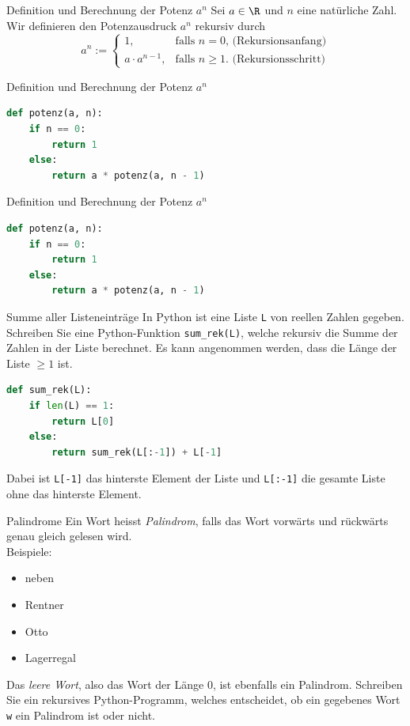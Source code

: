 \begin{frame}[fragile]{Definition und Berechnung der Potenz $a^n$}
Sei $a\in\R$ und $n$ eine natürliche Zahl. Wir definieren den Potenzausdruck $a^n$ rekursiv durch
\[
  a^n := 
  \begin{cases}
    1, &\text{falls $n=0$, (Rekursionsanfang)} \\
    a\cdot a^{n-1}, & \text{falls  $n\geq 1$. (Rekursionsschritt)}
  \end{cases}
\]
\end{frame}

\begin{frame}[fragile]{Definition und Berechnung der Potenz $a^n$}
\begin{lstlisting}[language=Python]
def potenz(a, n):
    if n == 0:
        return 1
    else:
        return a * potenz(a, n - 1)
\end{lstlisting}
\end{frame}

\begin{frame}[fragile]{Definition und Berechnung der Potenz $a^n$}
\begin{lstlisting}[language=Python]
def potenz(a, n):
    if n == 0:
        return 1
    else:
        return a * potenz(a, n - 1)
\end{lstlisting}
\end{frame}


\begin{frame}[fragile]{Summe aller Listeneinträge}
In Python ist eine Liste \lstinline|L| von reellen Zahlen gegeben. Schreiben Sie eine Python-Funktion \lstinline|sum_rek(L)|, welche rekursiv die Summe der Zahlen in der Liste berechnet. Es kann angenommen werden, dass die Länge der Liste $\geq 1$ ist.
\begin{lstlisting}[language=Python]
def sum_rek(L):
    if len(L) == 1:
        return L[0]
    else:
        return sum_rek(L[:-1]) + L[-1]
\end{lstlisting}
Dabei ist \lstinline|L[-1]| das hinterste Element der Liste und \lstinline|L[:-1]| die gesamte Liste ohne das hinterste Element.
\end{frame}



\begin{frame}[fragile]{Palindrome}
Ein Wort heisst \textit{Palindrom}, falls das Wort vorwärts und rückwärts genau gleich gelesen wird.\\
Beispiele:
\begin{itemize}
    \item neben
    \item Rentner
    \item Otto
    \item Lagerregal
\end{itemize}
Das \textit{leere Wort}, also das Wort der Länge $0$, ist ebenfalls ein Palindrom. Schreiben Sie ein rekursives Python-Programm, welches entscheidet, ob ein gegebenes Wort \verb|w| ein Palindrom ist oder nicht.
\end{frame}


